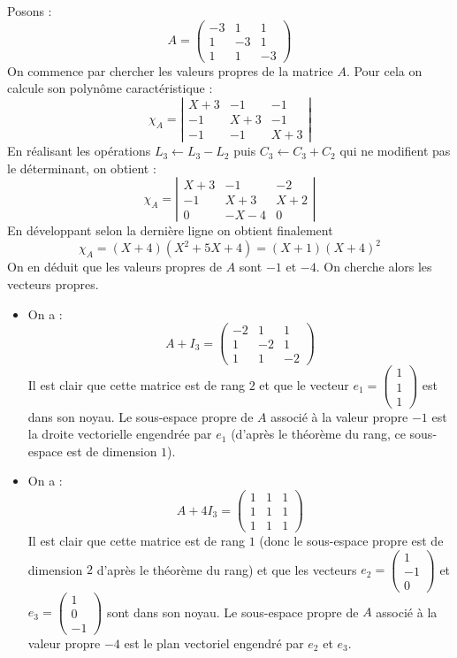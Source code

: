 \documentclass[a4paper,10pt]{report}
\begin{document}
\corr Posons :
$$ A = \left(\begin{array}{ccc} -3 & 1 & 1 \\ 1 & -3 & 1 \\ 1 & 1 & -3 \end{array}\right)$$
On commence par chercher les valeurs propres de la matrice $A$. Pour cela on calcule son polynôme caractéristique :
$$\chi_A = \left|\begin{array}{cccc} X + 3 & -1 & -1 \\ -1 & X+3 & -1 \\ -1 & -1 & X+3 \end{array}\right|$$
En réalisant les opérations $L_3 \leftarrow L_3 - L_2$ puis $C_3 \leftarrow C_3 + C_2$ qui ne modifient pas le déterminant, on obtient :
$$\chi_A = \left|\begin{array}{cccc} X + 3 & -1 & -2 \\ -1 & X+3 & X+2 \\ 0 & -X-4 & 0 \end{array}\right|$$
En développant selon la dernière ligne on obtient finalement 
$$\chi_A = (X+4)(X^2+5X+4) = (X+1)(X+4)^2$$
On en déduit que les valeurs propres de $A$ sont $-1$ et $-4$. On cherche alors les vecteurs propres.
\begin{itemize}
\item On a :
$$A + I_3 = \left(\begin{array}{ccc} -2 & 1 & 1 \\ 1 & -2 & 1 \\ 1 & 1 & -2 \end{array}\right)$$
Il est clair que cette matrice est de rang $2$ et que le vecteur $e_1 = \left(\begin{array}{ccc} 1 \\ 1 \\ 1 \end{array}\right)$ est dans son noyau. Le sous-espace propre de $A$ associé à la valeur propre $-1$ est la droite vectorielle engendrée par $e_1$ (d'après le théorème du rang, ce sous-espace est de dimension $1$).
\item On a :
$$A + 4I_3 = \left(\begin{array}{ccc} 1 & 1 & 1 \\ 1 & 1 & 1 \\ 1 & 1 & 1 \end{array}\right)$$
Il est clair que cette matrice est de rang $1$ (donc le sous-espace propre est de dimension $2$ d'après le théorème du rang) et que les vecteurs $e_2 = \left(\begin{array}{ccc} 1 \\ -1 \\ 0 \end{array}\right)$ et $e_3 = \left(\begin{array}{ccc} 1 \\ 0 \\ -1 \end{array}\right)$ sont dans son noyau. Le sous-espace propre de $A$ associé à la valeur propre $-4$ est le plan vectoriel engendré par $e_2$ et $e_3$.
\end{itemize}
\end{document}
